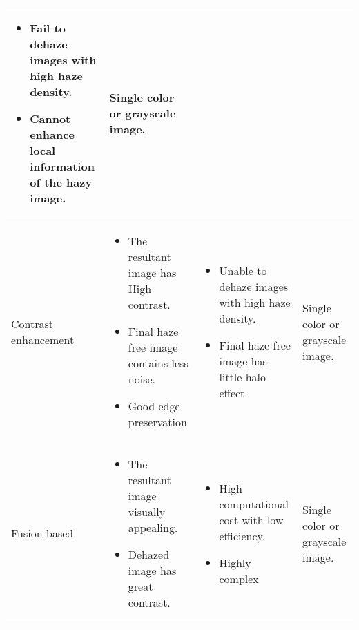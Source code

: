 \documentclass[doctor,english,listoffigures,listoftables]{thesis-uestc}
\begin{document}
\begin{table}[!htb]
\begin{tabular}{ | m{2.5cm} | m{4.5cm}| m{4.5cm} | m{2.8cm} | }
        \begin{itemize} 
            \item Fail to dehaze images with high haze density.
            \item Cannot enhance local information of the hazy image. 
        \end{itemize} & Single color or grayscale image.
        \\
        \hline
        Contrast enhancement & 
        \begin{itemize} 
            \item The resultant image has High contrast. 
            \item Final haze free image contains less noise. 
            \item Good edge preservation
        \end{itemize} & 

        \begin{itemize} 
            \item Unable to dehaze images with high haze density.
            \item Final haze free image has little halo effect. 
        \end{itemize} & Single color or grayscale image.
        \\
        \hline
        Fusion-based & 
        \begin{itemize} 
            \item The resultant image visually appealing.
            \item Dehazed image has great contrast. 
        \end{itemize} & 

        \begin{itemize} 
            \item High computational cost with low efficiency.
            \item Highly complex 
        \end{itemize} & Single color or grayscale image.
        \\
        \hline
    \end{tabular}
    \label{Tab1}
\end{table} 
\end{document}
